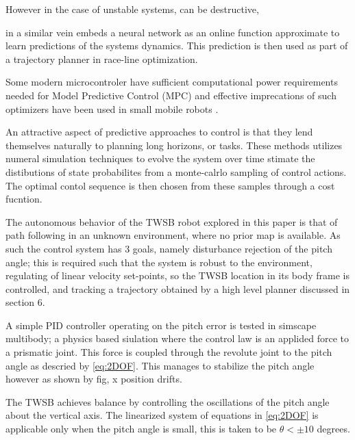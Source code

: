         However in the case of unstable systems, can be destructive,


        
        
        \cite{williams2016aggressive} in a similar vein embeds
        a neural network as an online function approximate to learn predictions of the systems dynamics. 
        This prediction is then used as part of a trajectory planner in race-line optimization. 

        Some modern microcontroler have sufficient computational power requirements needed for Model Predictive Control (MPC) and 
        effective imprecations of such optimizers have been used in small mobile robots \cite{nguyen2024tinympc}. 

        An attractive aspect of predictive approaches to control is that they lend themselves naturally to 
        planning long horizons, or tasks. These methods utilizes numeral simulation techniques to evolve the system 
        over time stimate the distibutions of state probabilites from a monte-calrlo sampling of control actions. The optimal
        contol sequence is then chosen from these samples through a cost fucntion. 
        

        
        The autonomous behavior of the TWSB 
        robot explored in this paper is that of path following in an unknown environment, where no prior 
        map is available. As such the control system has 3 goals, namely disturbance rejection of the
        pitch angle; this is required such that the system is robust to the environment, 
        regulating of linear velocity set-points, so the TWSB location in its body frame is controlled, 
        and tracking a trajectory obtained by a high level planner discussed in section 6. 

        A simple PID controller operating on the pitch error is tested in simscape multibody; 
        a physics based siulation where the control law 
        is an applided force to a prismatic joint. This force is coupled through the revolute 
        joint to the pitch angle as descried by \ref{eq:2DOF}.
        This manages to stabilize the pitch angle however as shown by fig, x position drifts.

        The TWSB achieves balance by controlling the oscillations of the pitch angle about the 
        vertical axis. The linearized system of equations in \ref{eq:2DOF} is applicable 
        only when the pitch angle is small, this is taken to be $\theta < ±10$ degrees. 
 
